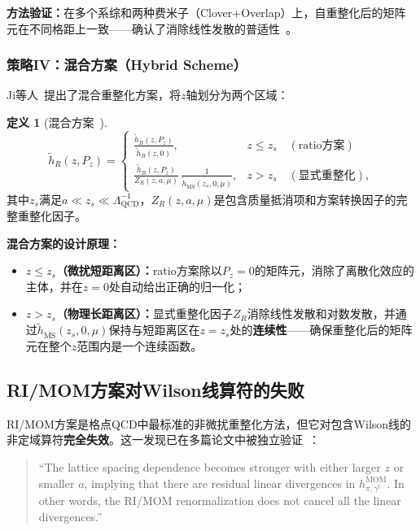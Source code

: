 \documentclass[12pt,a4paper]{ctexart}
\theoremstyle{definition}
\newtheorem{definition}{定义}[section]
\begin{document}
\textbf{方法验证：}在多个系综和两种费米子（Clover+Overlap）上，自重整化后的矩阵元在不同格距上一致——确认了消除线性发散的普适性~\cite{Huo2021self}。

\subsubsection{策略IV：混合方案（Hybrid Scheme）}

Ji等人~\cite{Ji2021hybrid}提出了混合重整化方案，将$z$轴划分为两个区域：

\begin{definition}[混合方案~\cite{Ji2021hybrid}]
\begin{equation}
\tilde h_R(z, P_z) = \begin{cases}
\displaystyle\frac{\tilde h_B(z, P_z)}{\tilde h_B(z, 0)}, & z \le z_s \quad (\text{ratio方案})\\[10pt]
\displaystyle\frac{\tilde h_B(z, P_z)}{Z_R(z, a, \mu)}\, \frac{1}{\tilde h_{\overline{\text{MS}}}(z_s, 0, \mu)}, & z > z_s \quad (\text{显式重整化}),
\end{cases}
\label{eq:hybrid_scheme}
\end{equation}
其中$z_s$满足$a \ll z_s \ll \Lambda_{\text{QCD}}^{-1}$，$Z_R(z, a, \mu)$是包含质量抵消项和方案转换因子的完整重整化因子。
\end{definition}

\textbf{混合方案的设计原理：}
\begin{itemize}[nosep]
    \item \textbf{$z \le z_s$（微扰短距离区）：}ratio方案除以$P_z=0$的矩阵元，消除了离散化效应的主体，并在$z=0$处自动给出正确的归一化；
    \item \textbf{$z > z_s$（物理长距离区）：}显式重整化因子$Z_R$消除线性发散和对数发散，并通过$\tilde h_{\overline{\text{MS}}}(z_s, 0, \mu)$保持与短距离区在$z=z_s$处的\textbf{连续性}——确保重整化后的矩阵元在整个$z$范围内是一个连续函数。
\end{itemize}

\subsection{RI/MOM方案对Wilson线算符的失败}

RI/MOM方案是格点QCD中最标准的非微扰重整化方法，但它对包含Wilson线的非定域算符\textbf{完全失效}。这一发现已在多篇论文中被独立验证~\cite{Zhang2022renormTMD,Huo2021self}：

\begin{quote}
``The lattice spacing dependence becomes stronger with either larger $z$ or smaller $a$, implying that there are residual linear divergences in $h^{\text{MOM}}_{\pi,\gamma^t}$. In other words, the RI/MOM renormalization does not cancel all the linear divergences.''~\cite{Zhang2022renormTMD}
\end{quote}
\end{document}

